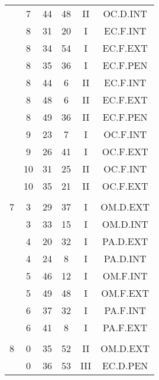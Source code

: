 \documentclass[12pt, a4paper]{article}
\begin{document}
\begin{multicols}{3}
{\begin{tabular}{c c c c c c}
	 	 	 	 & 7 & 44 & 48 & II & OC.D.INT\\%
	 	 	 	 & 8 & 31 & 20 & I & EC.F.INT\\%
	 	 	 	 & 8 & 34 & 54 & I & EC.F.EXT\\%
	 	 	 	 & 8 & 35 & 36 & I & EC.F.PEN\\%
	 	 	 	 & 8 & 44 & 6 & II & EC.F.INT\\%
	 	 	 	 & 8 & 48 & 6 & II & EC.F.EXT\\%
	 	 	 	 & 8 & 49 & 36 & II & EC.F.PEN\\%
	 	 	 	 & 9 & 23 & 7 & I & OC.F.INT\\%
	 	 	 	 & 9 & 26 & 41 & I & OC.F.EXT\\%
	 	 	 	 & 10 & 31 & 25 & II & OC.F.INT\\%
	 	 	 	 & 10 & 35 & 21 & II & OC.F.EXT\\%
	 	 	 	 & & & & & \\%
	 	 	 	7 & 3 & 29 & 37 & I & OM.D.EXT\\%
	 	 	 	 & 3 & 33 & 15 & I & OM.D.INT\\%
	 	 	 	 & 4 & 20 & 32 & I & PA.D.EXT\\%
	 	 	 	 & 4 & 24 & 8 & I & PA.D.INT\\%
	 	 	 	 & 5 & 46 & 12 & I & OM.F.INT\\%
	 	 	 	 & 5 & 49 & 48 & I & OM.F.EXT\\%
	 	 	 	 & 6 & 37 & 32 & I & PA.F.INT\\%
	 	 	 	 & 6 & 41 & 8 & I & PA.F.EXT\\%
	 	 	 	 & & & & & \\%
	 	 	 	8 & 0 & 35 & 52 & II & OM.D.EXT\\%
	 	 	 	 & 0 & 36 & 53 & III & EC.D.PEN\\%

\end{tabular}}
\end{multicols}
\end{document}
